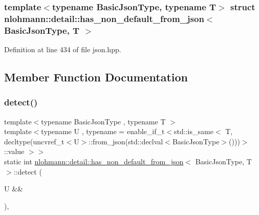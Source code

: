 \subsubsection*{template$<$typename Basic\+Json\+Type, typename T$>$\newline
struct nlohmann\+::detail\+::has\+\_\+non\+\_\+default\+\_\+from\+\_\+json$<$ Basic\+Json\+Type, T $>$}



Definition at line 434 of file json.\+hpp.



\subsection{Member Function Documentation}
\mbox{\label{structnlohmann_1_1detail_1_1has__non__default__from__json_a87428058d4e01d8f034ec5b2574795a3}} 
\subsubsection{\texorpdfstring{detect()}{detect()}\hspace{0.1cm}{\footnotesize\ttfamily [1/2]}}
{\footnotesize\ttfamily template$<$typename Basic\+Json\+Type , typename T $>$ \\
template$<$typename U , typename  = enable\+\_\+if\+\_\+t$<$std\+::is\+\_\+same$<$                                   T, decltype(uncvref\+\_\+t$<$\+U$>$\+::from\+\_\+json(std\+::declval$<$\+Basic\+Json\+Type$>$()))$>$\+::value $>$$>$ \\
static int \hyperlink{structnlohmann_1_1detail_1_1has__non__default__from__json}{nlohmann\+::detail\+::has\+\_\+non\+\_\+default\+\_\+from\+\_\+json}$<$ Basic\+Json\+Type, T $>$\+::detect (\begin{DoxyParamCaption}\item[{U \&\&}]{ }\end{DoxyParamCaption})\hspace{0.3cm}{\ttfamily [static]}, {\ttfamily [private]}}

\mbox{\label{structnlohmann_1_1detail_1_1has__non__default__from__json_aa9d6fc482c9b96cf5ffbba95d4afd01a}} 
